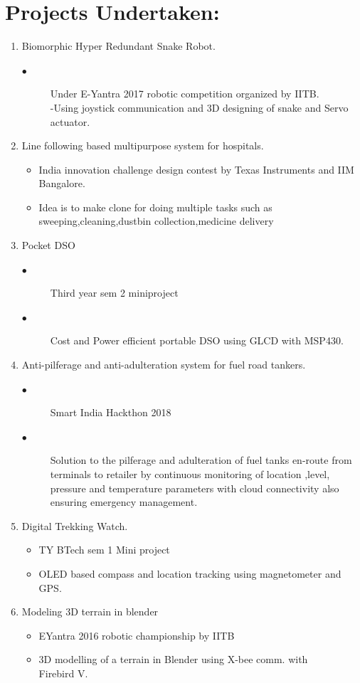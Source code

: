 \documentclass[16pt,a4paper]{article}
\begin{document}
\section{Projects Undertaken:} 
\begin{enumerate}
	
	\item Biomorphic Hyper Redundant Snake Robot.
	\begin{description}
		\item [$\bullet$]Under E-Yantra 2017 robotic competition organized by IITB.\\
		-Using joystick communication and 3D designing of snake and Servo actuator.
	\end{description}
	\item  Line following based multipurpose system for hospitals.
	\begin{itemize}
		\item India innovation challenge design contest by Texas Instruments and IIM Bangalore.
		\item	Idea is to make clone for doing multiple tasks such as sweeping,cleaning,dustbin collection,medicine delivery
	\end{itemize}
	\item Pocket DSO
	\begin{description}
		\item [$\bullet$]Third  year sem 2 miniproject
		\item [$\bullet$]Cost and Power efficient portable DSO using GLCD with MSP430.\\
	\end{description}
	
	\item  Anti-pilferage and anti-adulteration system for fuel road tankers. 
	\begin{description}
		\item [$\bullet$] Smart India Hackthon 2018
		\item [$\bullet$]Solution to the pilferage and adulteration of fuel tanks en-route from terminals to retailer by continuous monitoring of location ,level, pressure and temperature parameters with cloud connectivity also ensuring emergency management. 
	\end{description}
	\item  Digital Trekking Watch.
	\begin{itemize}
		\item TY BTech sem 1 Mini project
		\item	OLED based compass and location tracking using magnetometer and GPS.
	\end{itemize}
	\item  Modeling 3D terrain in blender
	\begin{itemize}
		\item EYantra 2016 robotic championship by IITB
		\item 3D modelling of a terrain in Blender  using  X-bee comm. with \\Firebird V.
	\end{itemize}
\end{enumerate}
\end{document}
